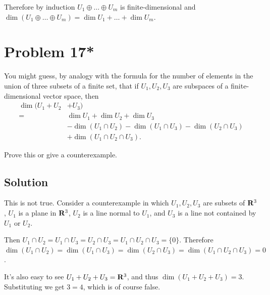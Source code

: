 \documentclass{article}
\begin{document}
\vs

Therefore by induction $U_1\oplus\ldots\oplus U_m$ is finite-dimensional and $\dim(U_1\oplus\ldots\oplus U_m)=\dim U_1+\ldots+\dim U_m$.

\section*{Problem 17*}
You might guess, by analogy with the formula for the number of elements in the union of three subsets of a finite set, that if $U_1, U_2, U_3$ are subspaces of a finite-dimensional vector space, then
\begin{align*}
    \dim(U_1+U_2&+U_3)\\
    =&\dim U_1 + \dim U_2 + \dim U_3\\
    &-\dim(U_1\cap U_2)-\dim(U_1\cap U_3)-\dim(U_2\cap U_3)\\
    &+\dim(U_1\cap U_2\cap U_3).
\end{align*}

Prove this or give a counterexample.

\subsection*{Solution}
This is not true. Consider a counterexample in which $U_1, U_2, U_3$ are subsets of $\mathbf{R}^3$, $U_1$ is a plane in $\mathbf{R}^3$, $U_2$ is a line normal to $U_1$, and $U_3$ is a line not contained by $U_1$ or $U_2$.

\vs

Then $U_1\cap U_2=U_1\cap U_3=U_2\cap U_3=U_1\cap U_2\cap U_3=\{0\}$. Therefore $\dim(U_1\cap U_2)=\dim(U_1\cap U_3)=\dim(U_2\cap U_3)=\dim(U_1\cap U_2\cap U_3)=0$.

\vs

It's also easy to see $U_1+U_2+U_3=\mathbf{R}^3$, and thus $\dim(U_1+U_2+U_3)=3$. Substituting we get $3=4$, which is of course false.
\end{document}
